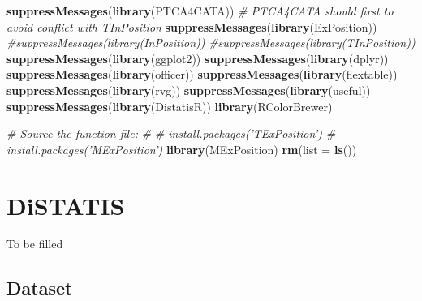 \documentclass[]{book}
\newenvironment{Shaded}{\begin{snugshade}}{\end{snugshade}}
\newcommand{\CommentTok}[1]{\textcolor[rgb]{0.56,0.35,0.01}{\textit{#1}}}
\newcommand{\DataTypeTok}[1]{\textcolor[rgb]{0.13,0.29,0.53}{#1}}
\newcommand{\KeywordTok}[1]{\textcolor[rgb]{0.13,0.29,0.53}{\textbf{#1}}}
\newcommand{\NormalTok}[1]{#1}
\begin{document}
\begin{Shaded}
\begin{Highlighting}[]
\KeywordTok{suppressMessages}\NormalTok{(}\KeywordTok{library}\NormalTok{(PTCA4CATA))}
\CommentTok{# PTCA4CATA should first to avoid conflict with TInPosition}
\KeywordTok{suppressMessages}\NormalTok{(}\KeywordTok{library}\NormalTok{(ExPosition))}
\CommentTok{#suppressMessages(library(InPosition))}
\CommentTok{#suppressMessages(library(TInPosition))}
\KeywordTok{suppressMessages}\NormalTok{(}\KeywordTok{library}\NormalTok{(ggplot2))}
\KeywordTok{suppressMessages}\NormalTok{(}\KeywordTok{library}\NormalTok{(dplyr))}
\KeywordTok{suppressMessages}\NormalTok{(}\KeywordTok{library}\NormalTok{(officer))}
\KeywordTok{suppressMessages}\NormalTok{(}\KeywordTok{library}\NormalTok{(flextable))}
\KeywordTok{suppressMessages}\NormalTok{(}\KeywordTok{library}\NormalTok{(rvg))}
\KeywordTok{suppressMessages}\NormalTok{(}\KeywordTok{library}\NormalTok{(useful))}
\KeywordTok{suppressMessages}\NormalTok{(}\KeywordTok{library}\NormalTok{(DistatisR))}
\KeywordTok{library}\NormalTok{(RColorBrewer)}


\CommentTok{# Source the function file:}
\CommentTok{#}
\CommentTok{# install.packages('TExPosition')}
\CommentTok{# install.packages('MExPosition')}
\KeywordTok{library}\NormalTok{(MExPosition)}
\KeywordTok{rm}\NormalTok{(}\DataTypeTok{list =} \KeywordTok{ls}\NormalTok{())}
\end{Highlighting}
\end{Shaded}

\hypertarget{distatis}{%
\section{DiSTATIS}\label{distatis}}

To be filled

\hypertarget{dataset-2}{%
\subsection{Dataset}\label{dataset-2}}
\end{document}
